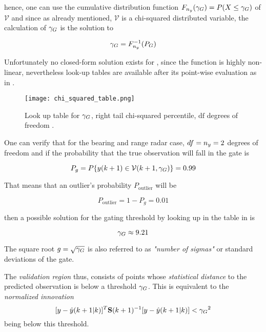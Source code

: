 hence, one can use the cumulative distribution function $F_{n_{{y}}}({\gamma_G})=P(X \leq {\gamma_G})$ of $\mathcal{V}$ and since as already mentioned, $\mathcal{V}$ is a chi-squared distributed variable, the calculation of ${\gamma_G}$ is the solution to 

\begin{equation}\label{eq:gammasol}
{\gamma_G} = F_{n_{{y}}}^{-1}(P_G) \end{equation}


Unfortunately no closed-form solution exists for  , since the function is highly non-linear, nevertheless look-up tables are available after its point-wise evaluation as in .





\begin{figure}[H]
	\centering
	\texttt{[image: chi\_squared\_table.png]}
	\caption{Look up table for ${\gamma_G}$, right tail chi-squared percentile, $\text{df}$ degrees of freedom .}
	\label{fig:chisquaredtable}
\end{figure}



One can verify that for the bearing and range radar case, $df = n_{y} =2 $ degrees of freedom and if the probability that the true observation will fall in the gate is

$$P_{g} = P\{ {y}(k+1)\in\mathcal{V}(k+1,{\gamma_G})\}=0.99$$


That means that an outlier's probability $P_{\text{outlier}}$ will be

$$P_{\text{outlier}} = 1 - P_g = 0.01$$

then a possible solution for the gating threshold by looking up in the table in  is

$${\gamma_G} \approx 9.21$$


The square root $g = \sqrt{{\gamma_G}}$ is also referred to as \emph{
"number of sigmas"} or standard deviations of the gate.

The \emph{validation region} thus, consists of points whose  \emph{statistical distance} to the predicted observation is below a threshold ${\gamma_G}$.  This is equivalent to the \emph{normalized innovation} $$[{y}-{\hat{{y}}}(k+1|k)]^T \mathbf{S}(k+1)^{-1} [{y}-{\hat{{y}}}(k+1|k)] < {\gamma_G}^2 $$ being below this threshold.

